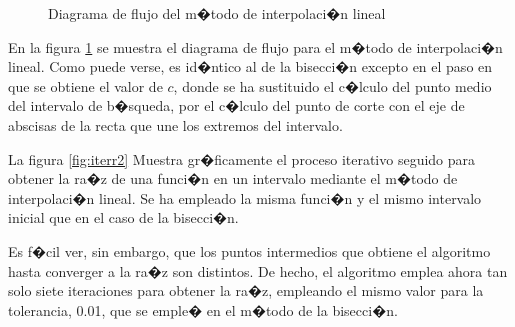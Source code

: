 \begin{figure}[h]
\centering
{}
\caption{Diagrama de flujo del m�todo de interpolaci�n lineal}
\label{fig:regula}
\end{figure}

En la figura \ref{fig:regula} se muestra el diagrama de flujo para el m�todo de interpolaci�n lineal. Como puede verse, es id�ntico al de la bisecci�n excepto en el paso en que se obtiene el valor de $c$, donde se ha sustituido el c�lculo del punto medio del intervalo de b�squeda, por el c�lculo del punto de corte con el eje de abscisas  de la recta que une los extremos del intervalo.

La figura \ref{fig:iterr2} Muestra gr�ficamente el proceso iterativo seguido para obtener la ra�z de una funci�n en un intervalo mediante el m�todo de interpolaci�n lineal. Se ha empleado la misma funci�n y el mismo intervalo inicial que en el caso de la bisecci�n. 

Es f�cil ver, sin embargo, que los puntos intermedios que obtiene el algoritmo hasta converger a la ra�z son distintos. De hecho, el algoritmo emplea ahora tan solo siete iteraciones para obtener la ra�z, empleando el mismo valor para la tolerancia, 0.01, que se emple� en el m�todo de la bisecci�n.

